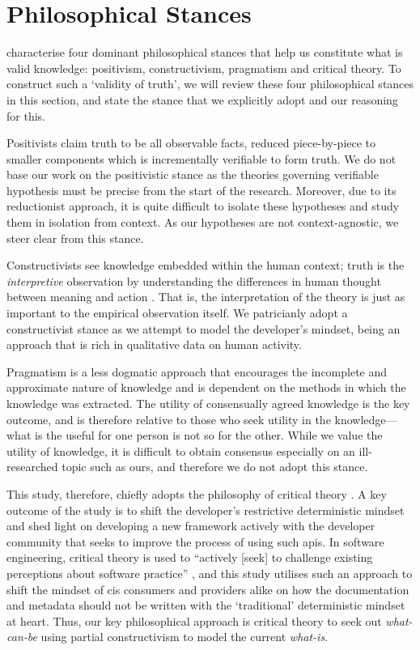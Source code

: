 \section{Philosophical Stances}
\label{sec:research-strategy:philosophical-stances}

\citet{Creswell:2017vn} characterise four dominant philosophical stances that help us constitute what is valid knowledge: positivism, constructivism, pragmatism and critical theory. To construct such a `validity of truth', we will review these four philosophical stances in this section, and state the stance that we explicitly adopt and our reasoning for this.

Positivists claim truth to be all observable facts, reduced piece-by-piece to smaller components which is incrementally verifiable to form truth. We do not base our work on the positivistic stance as the theories governing verifiable hypothesis must be precise from the start of the research. Moreover, due to its reductionist approach, it is quite difficult to isolate these hypotheses and study them in isolation from context. As our hypotheses are not context-agnostic, we steer clear from this stance.

Constructivists see knowledge embedded within the human context; truth is the \textit{interpretive} observation by understanding the differences in human thought between meaning and action . That is, the interpretation of the theory is just as important to the empirical observation itself. We patricianly adopt a constructivist stance as we attempt to model the developer's mindset, being an approach that is rich in qualitative data on human activity.

Pragmatism is a less dogmatic approach that encourages the incomplete and approximate nature of knowledge and is dependent on the methods in which the knowledge was extracted. The utility of consensually agreed knowledge is the key outcome, and is therefore relative to those who seek utility in the knowledge---what is the useful for one person is not so for the other. While we value the utility of knowledge, it is difficult to obtain consensus especially on an ill-researched topic such as ours, and therefore we do not adopt this stance.

This study, therefore, chiefly adopts the philosophy of critical theory . A key outcome of the study is to shift the developer's restrictive deterministic mindset and shed light on developing a new framework actively with the developer community that seeks to improve the process of using such \glspl{api}. In software engineering, critical theory is used to ``actively [seek] to challenge existing perceptions about software practice'' \citep{Easterbrook:2007ws}, and this study utilises such an approach to shift the mindset of \gls{cis} consumers and providers alike on how the documentation and metadata should not be written with the `traditional' deterministic mindset at heart. Thus, our key philosophical approach is critical theory to seek out \textit{what-can-be} using  partial constructivism to model the current \textit{what-is}.
